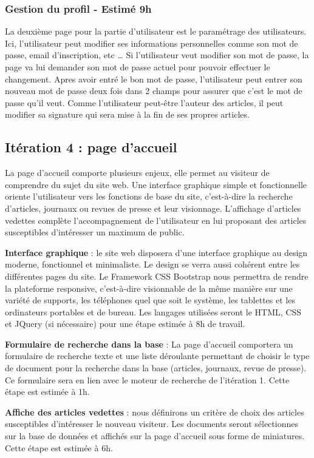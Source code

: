 		\subsubsection{Gestion du profil - Estimé 9h}
		La deuxième page pour la partie d’utilisateur est le paramétrage des utilisateurs. Ici, l’utilisateur peut modifier ses informations personnelles comme son mot de passe, email d’inscription, etc … Si l’utilisateur veut modifier son mot de passe, la page va lui demander son mot de passe actuel pour pouvoir effectuer le changement. Apres avoir entré le bon mot de passe, l’utilisateur peut entrer son nouveau mot de passe deux fois dans 2 champs pour assurer que c’est le mot de passe qu’il veut. Comme l’utilisateur peut-être l’auteur des articles, il peut modifier sa signature qui sera mise à la fin de ses propres articles.


	\subsection{Itération 4 : page d'accueil}

		La page d'accueil comporte plusieurs enjeux, elle permet au visiteur de comprendre du sujet du site web. Une interface graphique simple et fonctionnelle oriente l'utilisateur vers les fonctions de base du site, c'est-à-dire la recherche d'articles, journaux ou revues de presse et leur visionnage. L'affichage d'articles vedettes complète l'accompagnement de l'utilisateur en lui proposant des articles susceptibles d'intéresser un maximum de public.

		\textbf{Interface graphique} : le site web disposera d'une interface graphique au design moderne, fonctionnel et minimaliste. Le design se verra aussi cohérent entre les différentes pages du site. Le Framework CSS Bootstrap nous permettra de rendre la plateforme responsive, c'est-à-dire visionnable de la même manière sur une variété de supports, les téléphones quel que soit le système, les tablettes et les ordinateurs portables et de bureau. Les langages utilisées seront le HTML, CSS et JQuery (si nécessaire) pour une étape estimée à 8h de travail.

		\textbf{Formulaire de recherche dans la base} : La page d’accueil comportera un formulaire de recherche texte et une liste déroulante permettant de choisir le type de document pour la recherche dans la base (articles, journaux, revue de presse). Ce formulaire sera en lien avec le moteur de recherche de l'itération 1. Cette étape est estimée à 1h.

		\textbf{Affiche des articles vedettes} : nous définirons un critère de choix des articles susceptibles d'intéresser le nouveau visiteur. Les documents seront sélectionnes sur la base de données et affichés sur la page d'accueil sous forme de miniatures. Cette étape est estimée à 6h.